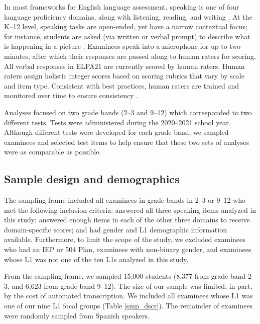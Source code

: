 \documentclass [PhD] {uclathes}
\begin{document}
In most frameworks for English language assessment, speaking is one of four language proficiency domains, along with listening, reading, and writing \citep{ccsso2012framework}. At the K–12 level, speaking tasks are open-ended, yet have a narrow contextual focus; for instance, students are asked (via written or verbal prompt) to describe what is happening in a picture \citep{luoma2004assessing}. Examinees speak into a microphone for up to two minutes, after which their responses are passed along to human raters for scoring. All verbal responses in ELPA21 are currently scored by human raters. Human raters assign holistic integer scores based on scoring rubrics that vary by scale and item type. Consistent with best practices, human raters are trained and monitored over time to ensure consistency \citep{engelhard2002monitoring}. 

Analyses focused on two grade bands (2–3 and 9–12) which corresponded to two different tests. Tests were administered during the 2020–2021 school year. Although different tests were developed for each grade band, we sampled examinees and selected test items to help ensure that these two sets of analyses were as comparable as possible. 

\subsection{Sample design and demographics}
\label{sec:meth_sample}

The sampling frame included all examinees in grade bands in 2–3 or 9–12 who met the following inclusion criteria: answered all three speaking items analyzed in this study; answered enough items in each of the other three domains to receive domain-specific scores; and had gender and L1 demographic information available. Furthermore, to limit the scope of the study, we excluded examinees who had an IEP or 504 Plan, examinees with non-binary gender, and examinees whose L1 was not one of the ten L1s analyzed in this study. 

From the sampling frame, we sampled 15,000 students (8,377 from grade band 2–3, and 6,623 from grade band 9–12). The size of our sample was limited, in part, by the cost of automated transcription. We included all examinees whose L1 was one of our nine L1 focal groups (Table \ref{smp_dscr}). The remainder of examinees were randomly sampled from Spanish speakers. 
\end{document}
